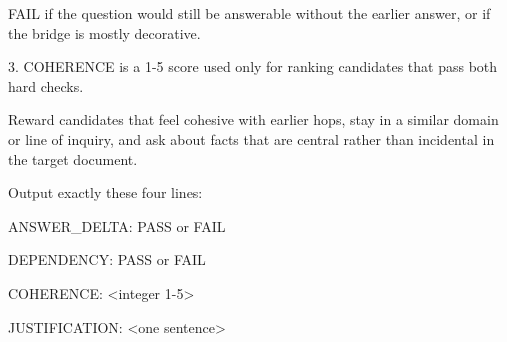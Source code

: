 \begin{tcolorbox}[colback=white, colframe=my-green, coltitle=black, parskip=5mm, title=\textbf{Transition Judge}, halign=flush left, enhanced, breakable, skin first=enhanced, skin middle=enhanced, skin last=enhanced]
\begin{scriptsize}
   FAIL if the question would still be answerable without the earlier answer, or if the bridge is mostly decorative.\par
3. COHERENCE is a 1-5 score used only for ranking candidates that pass both hard checks.\par
   Reward candidates that feel cohesive with earlier hops, stay in a similar domain or line of inquiry, and ask about facts that are central rather than incidental in the target document.\par
\mbox{}\par
Output exactly these four lines:\par
ANSWER\_DELTA: PASS or FAIL\par
DEPENDENCY: PASS or FAIL\par
COHERENCE: \textless{}integer 1-5\textgreater{}\par
JUSTIFICATION: \textless{}one sentence\textgreater{}\par
\end{scriptsize}
\end{tcolorbox}


